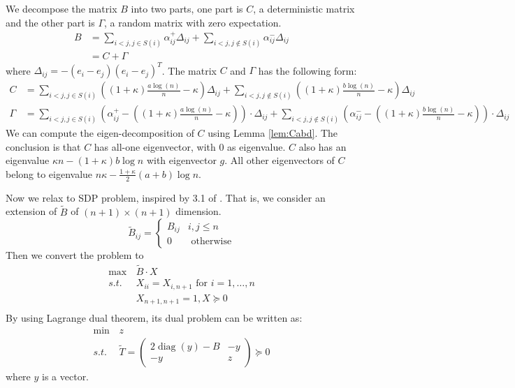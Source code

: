 \documentclass{ctexart}
\DeclareMathOperator{\diag}{diag}
\newcommand{\A}{\frac{a \log(n)}{n}}
\newcommand{\B}{\frac{b \log(n)}{n}}
\begin{document}
We decompose the matrix $B$ into two parts, one part is $C$, a deterministic matrix and the other part is $\Gamma$, a random matrix
with zero expectation.
\begin{align}
B & = \sum_{i<j, j\in S(i)} \alpha_{ij}^+ \Delta_{ij} + \sum_{i<j, j\not\in S(i)}\alpha_{ij}^- \Delta_{ij} \\
& = C + \Gamma
\end{align}
where $\Delta_{ij} = -(e_i - e_j)(e_i - e_j)^T $.
The matrix $C$ and $\Gamma$ has the following form:
\begin{align*}
C &=  \sum_{i<j, j \in S(i)}\left((1+\kappa)\A-\kappa\right)\Delta_{ij}+\sum_{i<j, j \notin S(i)} \left((1+\kappa)\B-\kappa\right) \Delta_{ij}\\
\Gamma &=  \sum_{i<j, j \in S(i)}\left( \alpha^{+}_{ij} - \left((1+\kappa)\A-\kappa\right) \right) \cdot \Delta_{ij} + \sum_{i<j, j \notin S(i)} \left(\alpha^{-}_{ij}-\left((1+\kappa)\B-\kappa\right)\right) \cdot \Delta_{ij}
\end{align*}
We can compute the eigen-decomposition of $C$ using Lemma \ref{lem:Cabd}. The conclusion is that
$C$ has all-one eigenvector, with 0 as eigenvalue. $C$ also has an eigenvalue $\kappa n-(1+\kappa)b\log n$ with eigenvector $g$.
All other eigenvectors of $C$ belong to eigenvalue $n\kappa-\frac{1+\kappa}{2}(a+b)\log n $.

Now we relax to SDP problem, inspired by 3.1 of \cite{rendl2010semidefinite}.
That is, we consider an extension of $\tilde{B}$ of $(n+1)\times (n+1)$ dimension.
\begin{equation}
\tilde{B}_{ij} = \begin{cases}
B_{ij} & i,j\leq n \\
0 & \textrm{ otherwise}
\end{cases}
\end{equation}
Then we convert the problem to
\begin{align*}
\max\,& \tilde{B} \cdot X \\
s.t. & X_{ii} = X_{i,n+1} \textrm{ for } i = 1, \dots, n\\
& X_{n+1, n+1} = 1, X \succeq 0 \\
\end{align*}
By using Lagrange dual theorem, its dual problem can be written as:
\begin{align*}
\min \, & z \\
s.t.\, & \widetilde{T} = \begin{pmatrix}
2\diag(y) - B & -y \\
-y & z 
\end{pmatrix}\succeq 0
\end{align*}
where $y$ is a vector.
\end{document}
